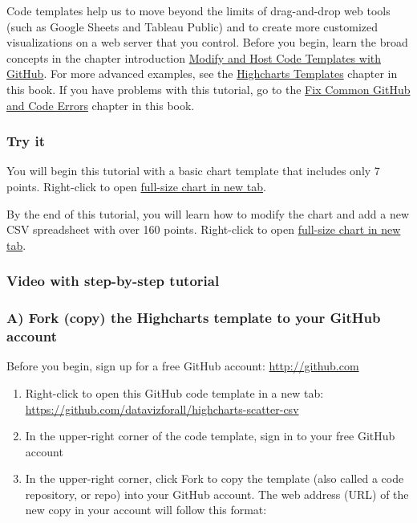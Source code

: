 \documentclass[
  english,
]{book}
\begin{document}
Code templates help us to move beyond the limits of drag-and-drop web tools (such as Google Sheets and Tableau Public) and to create more customized visualizations on a web server that you control. Before you begin, learn the broad concepts in the chapter introduction \href{github}{Modify and Host Code Templates with GitHub}. For more advanced examples, see the \href{highcharts}{Highcharts Templates} chapter in this book. If you have problems with this tutorial, go to the \href{fix-code}{Fix Common GitHub and Code Errors} chapter in this book.

\hypertarget{try-it-7}{%
\subsubsection*{Try it}\label{try-it-7}}

You will begin this tutorial with a basic chart template that includes only 7 points. Right-click to open \href{https://datavizforall.github.io/highcharts-scatter-csv/}{full-size chart in new tab}.

By the end of this tutorial, you will learn how to modify the chart and add a new CSV spreadsheet with over 160 points. Right-click to open \href{https://datavizforall.github.io/highcharts-scatter-csv-instructor-sample}{full-size chart in new tab}.

\hypertarget{video-with-step-by-step-tutorial-7}{%
\subsubsection*{Video with step-by-step tutorial}\label{video-with-step-by-step-tutorial-7}}

\hypertarget{a-fork-copy-the-highcharts-template-to-your-github-account}{%
\subsubsection*{A) Fork (copy) the Highcharts template to your GitHub account}\label{a-fork-copy-the-highcharts-template-to-your-github-account}}

Before you begin, sign up for a free GitHub account: \url{http://github.com}

\begin{enumerate}
\def\labelenumi{\arabic{enumi})}
\item
  Right-click to open this GitHub code template in a new tab: \url{https://github.com/datavizforall/highcharts-scatter-csv}
\item
  In the upper-right corner of the code template, sign in to your free GitHub account
\item
  In the upper-right corner, click Fork to copy the template (also called a code repository, or repo) into your GitHub account. The web address (URL) of the new copy in your account will follow this format:
\end{enumerate}
\end{document}
